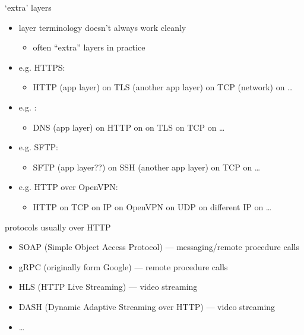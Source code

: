 \begin{frame}{`extra' layers}
    \begin{itemize}
    \item layer terminology doesn't always work cleanly
        \begin{itemize}
        \item often ``extra'' layers in practice
        \end{itemize}
    \item e.g. HTTPS:
        \begin{itemize}
        \item HTTP (app layer) on TLS (another app layer) on TCP (network) on \ldots
        \end{itemize}
    \item e.g. :
        \begin{itemize}
        \item DNS (app layer) on HTTP on on TLS on TCP on \ldots
        \end{itemize}
    \item e.g. SFTP:
        \begin{itemize}
        \item SFTP (app layer??) on SSH (another app layer) on TCP on \ldots
        \end{itemize}
    \item e.g. HTTP over OpenVPN:
        \begin{itemize}
        \item HTTP on TCP on IP on OpenVPN on UDP on different IP on \ldots
        \end{itemize}
    \end{itemize}
\end{frame}

\begin{frame}{protocols usually over HTTP}
    \begin{itemize}
    \item SOAP (Simple Object Access Protocol) --- messaging/remote procedure calls
    \item gRPC (originally form Google) --- remote procedure calls
    \item HLS (HTTP Live Streaming) --- video streaming
    \item DASH (Dynamic Adaptive Streaming over HTTP) --- video streaming
    \item \ldots
    \end{itemize}
\end{frame}

